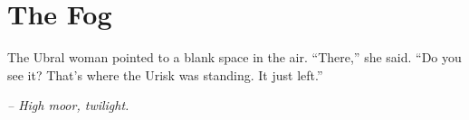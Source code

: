 \chapter*{The Fog}

The Ubral woman pointed to a blank space in the air. ``There,'' she said. ``Do you see it? That's where the Urisk was standing. It just left.''

\smallskip

\noindent \textit{-- High moor, twilight.}

